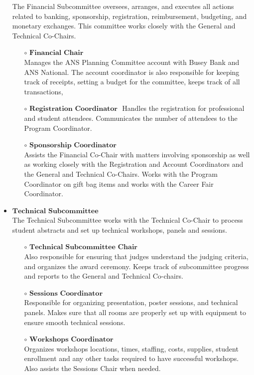 \begin{itemize}
	The Financial Subcommittee oversees, arranges, and executes all actions related to banking, sponsorship, registration, reimbursement, budgeting, and monetary exchanges. This committee works closely with the General and Technical Co-Chairs.
	\begin{itemize}
		\item[$\circ$] $\textbf{Financial Chair}$\\
		Manages the ANS Planning Committee account with Busey Bank and ANS National. The account coordinator is also responsible for keeping track of receipts, setting a budget for the committee, keeps track of all transactions, 
		\item[$\circ$] $\textbf{Registration Coordinator }$
		Handles the registration for professional and student attendees. Communicates the number of attendees to the Program Coordinator. 
		\item[$\circ$] $\textbf{Sponsorship Coordinator}$\\
		Assists the Financial Co-Chair with matters involving sponsorship as well as working closely with the Registration and Account Coordinators and the General and Technical Co-Chairs. Works with the Program Coordinator on gift bag items and works with the Career Fair Coordinator.
	\end{itemize}
	\item $\textbf{Technical Subcommittee}$\\
	The Technical Subcommittee works with the Technical Co-Chair to process student abstracts and set up 
	technical workshops, panels and sessions. 
	\begin{itemize}
		\item[$\circ$] $\textbf{Technical Subcommittee Chair}$\\
		 Also responsible for ensuring that judges understand the judging criteria, and organizes the award ceremony.
		Keeps track of subcommittee progress and reports to the General and Technical Co-chairs.
		\item[$\circ$] $\textbf{Sessions Coordinator}$\\
		Responsible for organizing presentation, poster sessions, and technical
		panels. Makes sure that all rooms are properly set up with equipment to ensure smooth technical sessions.
		\item[$\circ$] $\textbf{Workshops Coordinator}$\\
		Organizes workshops locations, times, staffing, costs, supplies, student enrollment
		and any other tasks required to have successful workshops. Also assists the Sessions Chair when needed.

\end{itemize}
\end{itemize}
